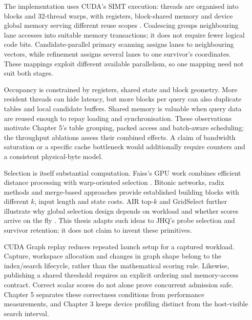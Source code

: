 The implementation uses CUDA's SIMT execution: threads are organised into
blocks and 32-thread warps, with registers, block-shared memory and device
global memory serving different reuse scopes \cite{cuda_programming_guide}.
Coalescing groups neighbouring lane accesses into suitable memory
transactions; it does not require fewer logical code bits. Candidate-parallel
primary scanning assigns lanes to neighbouring vectors, while refinement
assigns several lanes to one survivor's coordinates. These mappings exploit
different available parallelism, so one mapping need not suit both stages.

Occupancy is constrained by registers, shared state and block geometry.
More resident threads can hide latency, but more blocks per query can also
duplicate tables and local candidate buffers. Shared memory is valuable
when query data are reused enough to repay loading and synchronisation.
These observations motivate Chapter 5's table grouping, packed access and
batch-aware scheduling; the throughput ablations assess their combined
effects. A claim of bandwidth saturation or a specific cache bottleneck
would additionally require counters and a consistent physical-byte model.

Selection is itself substantial computation. Faiss's GPU work combines
efficient distance processing with warp-oriented selection
\cite{johnson_gpu}. Bitonic networks, radix methods and merge-based
approaches provide established building blocks with different $k$, input
length and state costs. AIR top-$k$ and GridSelect further illustrate why
global selection design depends on workload and whether scores arrive
on the fly \cite{gpu_topk}. This thesis adapts such ideas to JHQ's probe
selection and survivor retention; it does not claim to invent these primitives.

CUDA Graph replay reduces repeated launch setup for a captured workload.
Capture, workspace allocation and changes in graph shape belong to the
index/search lifecycle, rather than the mathematical scoring rule.
Likewise, publishing a shared threshold requires an explicit ordering and
memory-access contract. Correct scalar scores do not alone prove concurrent
admission safe. Chapter 5 separates these correctness conditions from
performance measurements, and Chapter 3 keeps device profiling distinct
from the host-visible search interval.
